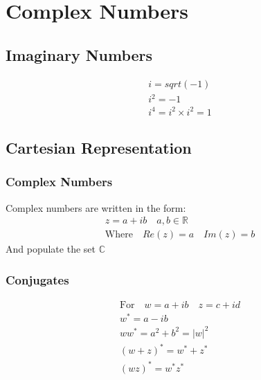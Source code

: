 \documentclass[../main]{subfiles}
\begin{document}
\section{Complex Numbers}

\subsection{Imaginary Numbers}
	\begin{equation*} \begin{gathered}
		i = sqrt(-1) \\
		i^2 = -1 \\
		i^4 = i^2 \times i^2 = 1
	\end{gathered} \end{equation*}

\subsection{Cartesian Representation}

	\subsubsection{Complex Numbers}
	Complex numbers are written in the form:
	\begin{equation*} \begin{gathered}
		z = a + ib \quad a,b \in \mathbb{R} \\
		\text{Where} \quad Re(z) = a \quad Im(z) = b
	\end{gathered} \end{equation*}
	And populate the set \(\mathbb{C}\)
	\subsubsection{Conjugates}
	\begin{equation*} \begin{gathered}
		\text{For} \quad w = a+ib \quad z = c+id \\
		w^* = a - ib \\
		ww^* = a^2 + b^2 = |w|^2\\
		(w+z)^* = w^* + z^* \\
		(wz)^* = w^*z^* \\
	\end{gathered} \end{equation*}
\end{document}
